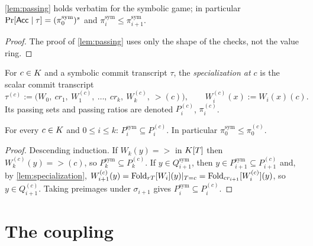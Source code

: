 \begin{lemma}\label{lem:passing-sym}
\cref{lem:passing} holds verbatim for the symbolic game; in particular
$\Pr[\mathsf{Acc}\mid\tau]=(\pi^{\mathrm{sym}}_0)^s$ and $\pi^{\mathrm{sym}}_i\le\pi^{\mathrm{sym}}_{i+1}$.
\end{lemma}

\begin{proof}
The proof of \cref{lem:passing} uses only the shape of the checks, not the value ring.
\end{proof}

\begin{definition}\label{def:specialized}
For $c\in K$ and a symbolic commit transcript $\tau$, the \emph{specialization at $c$} is
the scalar commit transcript
\[
\tau^{(c)}:=\bigl(W_0,\ cr_1,\ W_1^{(c)},\ \dots,\ cr_k,\ W_k^{(c)},\ \gt(c)\bigr),
\qquad W_i^{(c)}(x):=W_i(x)(c).
\]
Its passing sets and passing ratios are denoted $P_i^{(c)}$, $\pi_i^{(c)}$.
\end{definition}

\begin{lemma}\label{lem:spec-passing}
For every $c\in K$ and $0\le i\le k$: $P_i^{\mathrm{sym}}\subseteq P_i^{(c)}$. In
particular $\pi^{\mathrm{sym}}_0\le\pi^{(c)}_0$.
\end{lemma}

\begin{proof}
Descending induction. If $W_k(y)=\gt$ in $K[T]$ then $W_k^{(c)}(y)=\gt(c)$, so
$P_k^{\mathrm{sym}}\subseteq P_k^{(c)}$. If $y\in Q^{\mathrm{sym}}_{i+1}$, then
$y\in P^{\mathrm{sym}}_{i+1}\subseteq P^{(c)}_{i+1}$ and, by \cref{lem:specialization},
$W^{(c)}_{i+1}(y)=\mathrm{Fold}_{rT}[W_i](y)|_{T=c}=\mathrm{Fold}_{cr_{i+1}}[W_i^{(c)}](y)$, so
$y\in Q^{(c)}_{i+1}$. Taking preimages under $\sigma_{i+1}$ gives
$P^{\mathrm{sym}}_i\subseteq P^{(c)}_i$.
\end{proof}

\section{The coupling}

